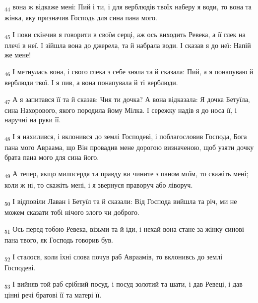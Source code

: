 \begin{tcolorbox}
\textsubscript{44} вона ж відкаже мені: Пий і ти, і для верблюдів твоїх наберу я води, то вона та жінка, яку призначив Господь для сина пана мого.
\end{tcolorbox}
\begin{tcolorbox}
\textsubscript{45} І поки скінчив я говорити в своїм серці, аж ось виходить Ревека, а її глек на плечі в неї. І зійшла вона до джерела, та й набрала води. І сказав я до неї: Напій же мене!
\end{tcolorbox}
\begin{tcolorbox}
\textsubscript{46} І метнулась вона, і свого глека з себе зняла та й сказала: Пий, а я понапуваю й верблюди твої. І я пив, а вона понапувала й ті верблюди.
\end{tcolorbox}
\begin{tcolorbox}
\textsubscript{47} А я запитався її та й сказав: Чия ти дочка? А вона відказала: Я дочка Бетуїла, сина Нахорового, якого породила йому Мілка. І сережку надів я до носа її, і наручні на руки її.
\end{tcolorbox}
\begin{tcolorbox}
\textsubscript{48} І я нахилився, і вклонився до землі Господеві, і поблагословив Господа, Бога пана мого Авраама, що Він провадив мене дорогою визначеною, щоб узяти дочку брата пана мого для сина його.
\end{tcolorbox}
\begin{tcolorbox}
\textsubscript{49} А тепер, якщо милосердя та правду ви чините з паном моїм, то скажіть мені; коли ж ні, то скажіть мені, і я звернуся праворуч або ліворуч.
\end{tcolorbox}
\begin{tcolorbox}
\textsubscript{50} І відповіли Лаван і Бетуїл та й сказали: Від Господа вийшла та річ, ми не можем сказати тобі нічого злого чи доброго.
\end{tcolorbox}
\begin{tcolorbox}
\textsubscript{51} Ось перед тобою Ревека, візьми та й іди, і нехай вона стане за жінку синові пана твого, як Господь говорив був.
\end{tcolorbox}
\begin{tcolorbox}
\textsubscript{52} І сталося, коли їхні слова почув раб Авраамів, то вклонивсь до землі Господеві.
\end{tcolorbox}
\begin{tcolorbox}
\textsubscript{53} І вийняв той раб срібний посуд, і посуд золотий та шати, і дав Ревеці, і дав цінні речі братові її та матері її.
\end{tcolorbox}
